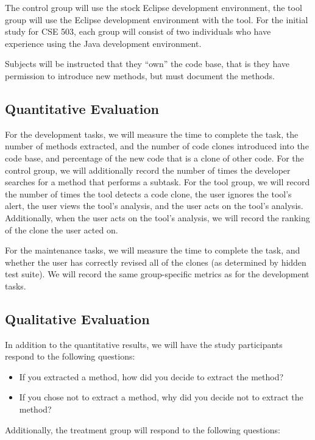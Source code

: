 \documentclass[preprint,10pt]{sigplanconf}
\begin{document}
The control group will use the stock Eclipse development
environment, the tool group will use the Eclipse development
environment with the tool. For the initial study for CSE 503, each
group will consist of two individuals who have experience using the
Java development environment.  

Subjects will be instructed that they ``own'' the code base, that is they
have permission to introduce new methods, but must document the
methods.  

\subsection{Quantitative Evaluation}
For the development tasks, we will measure the time to complete the
task, the number of methods extracted, and the number of code clones
introduced into the code base, and percentage of the new code that is
a clone of other code. For the control group, we will additionally
record the number of times the developer searches for a method that
performs a subtask. For the tool group, we will record the number of
times the tool detects a code clone, the user ignores the tool's
alert, the user views the tool's analysis, and the user acts on the
tool's analysis. Additionally, when the user acts on the tool's
analysis, we will record the ranking of the clone the user acted on.

For the maintenance tasks, we will measure the time to complete the
task, and whether the user has correctly revised all of the clones (as
determined by hidden test suite). We will record the same
group-specific metrics as for the development tasks.

\subsection{Qualitative Evaluation}
In addition to the quantitative results, we will have the study
participants respond to the following questions:

\begin{itemize}
  \item If you extracted a method, how did you decide to extract the
    method? 
  \item If you chose not to extract a method, why did you decide not
    to extract the method?
\end{itemize}

\noindent Additionally, the treatment group will respond to the following
questions:
\end{document}
